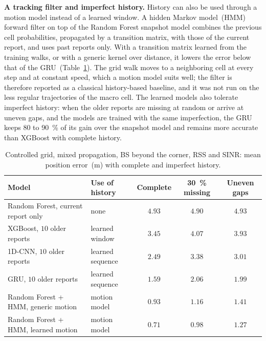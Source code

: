 \noindent\textbf{A tracking filter and imperfect history.} History can also be used through a motion model instead of a learned window. A hidden Markov model~(HMM) forward filter on top of the Random Forest snapshot model combines the previous cell probabilities, propagated by a transition matrix, with those of the current report, and uses past reports only. With a transition matrix learned from the training walks, or with a generic kernel over distance, it lowers the error below that of the GRU~(Table~\ref{tab:grid-baselines}). The grid walk moves to a neighboring cell at every step and at constant speed, which a motion model suits well; the filter is therefore reported as a classical history-based baseline, and it was not run on the less regular trajectories of the macro cell. The learned models also tolerate imperfect history: when the older reports are missing at random or arrive at uneven gaps, and the models are trained with the same imperfection, the GRU keeps $80$ to \SI{90}{\percent} of its gain over the snapshot model and remains more accurate than XGBoost with complete history.

\begin{table}[h]
  \centering
  \caption{Controlled grid, mixed propagation, BS beyond the corner, RSS and SINR: mean position error~(m) with complete and imperfect history.}
  \label{tab:grid-baselines}
  \small
  \begin{tabular}{@{}llccc@{}}
    \toprule
    Model & Use of history & Complete & \SI{30}{\percent} missing & Uneven gaps \\
    \midrule
    Random Forest, current report only & none & $4.93$ & $4.90$ & $4.93$ \\
    XGBoost, $10$ older reports & learned window & $3.45$ & $4.07$ & $3.93$ \\
    1D-CNN, $10$ older reports & learned sequence & $2.49$ & $3.38$ & $3.01$ \\
    GRU, $10$ older reports & learned sequence & $1.59$ & $2.06$ & $1.99$ \\
    Random Forest + HMM, generic motion & motion model & $0.93$ & $1.16$ & $1.41$ \\
    Random Forest + HMM, learned motion & motion model & $0.71$ & $0.98$ & $1.27$ \\
    \bottomrule
  \end{tabular}
\end{table}
